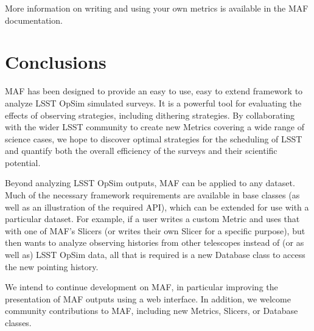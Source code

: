 \documentclass[]{spie}  %
\begin{document}
More information on writing and using your own metrics is available in
the MAF documentation. 


\section{Conclusions}

MAF has been designed to provide an easy to use, easy to extend
framework to analyze LSST OpSim simulated surveys. It is a powerful
tool for evaluating the effects of observing strategies, including
dithering strategies.  By collaborating with the wider LSST community
to create new Metrics covering a wide range of science cases, we hope
to discover optimal strategies for the scheduling of LSST and quantify
both the overall efficiency of the surveys and their scientific
potential.

Beyond analyzing LSST OpSim outputs, MAF can be applied to any
dataset. Much of the necessary framework requirements are available in
base classes (as well as an illustration of the required API), which
can be extended for use with a particular dataset. For example, if a
user writes a custom Metric and uses that with one of MAF's
Slicers (or writes their own Slicer for a specific purpose), but then
wants to analyze observing histories from other telescopes instead of
(or as well as) LSST OpSim data, all that is required is a new
Database class to access the new pointing history.

We intend to continue development on MAF, in particular improving the
presentation of MAF outputs using a web interface. In addition, we
welcome community contributions to MAF, including new Metrics,
Slicers, or Database classes.  

\appendix
\end{document}

